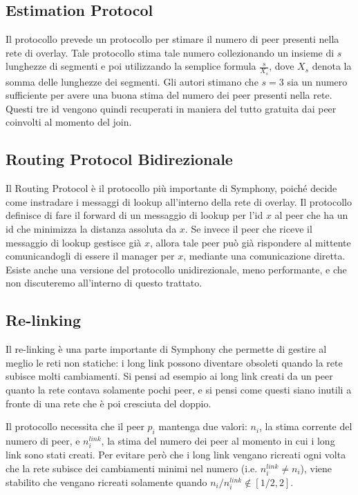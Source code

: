 \documentclass[prodmode,acmtap]{acmlarge}
\begin{document}
\subsection{Estimation Protocol}
Il protocollo prevede un protocollo per stimare il numero di peer presenti nella rete di overlay. Tale protocollo stima tale numero collezionando un insieme di $s$ lunghezze di segmenti e poi utilizzando la semplice formula $\frac{s}{X_s}$, dove $X_s$ denota la somma delle lunghezze dei segmenti. Gli autori stimano che $s = 3$ sia un numero sufficiente per avere una buona stima del numero dei peer presenti nella rete. Questi tre id vengono quindi recuperati in maniera del tutto gratuita dai peer coinvolti al momento del join. 

\subsection{Routing Protocol Bidirezionale}
Il Routing Protocol è il protocollo più importante di Symphony, poiché decide come instradare i messaggi di lookup all'interno della rete di overlay. Il protocollo definisce di fare il forward di un messaggio di lookup per l'id $x$ al peer che ha un id che minimizza la distanza assoluta da $x$. Se invece il peer che riceve il messaggio di lookup gestisce già $x$, allora tale peer può già rispondere al mittente comunicandogli di essere il manager per $x$, mediante una comunicazione diretta. Esiste anche una versione del protocollo unidirezionale, meno performante, e che non discuteremo all'interno di questo trattato.

\subsection{Re-linking}
Il re-linking è una parte importante di Symphony che permette di gestire al meglio le reti non statiche: i long link possono diventare obsoleti quando la rete subisce molti cambiamenti. Si pensi ad esempio ai long link creati da un peer quanto la rete contava solamente pochi peer, e si pensi come questi siano inutili a fronte di una rete che è poi cresciuta del doppio. 

Il protocollo necessita che il peer $p_i$ mantenga due valori: $n_i$, la stima corrente del numero di peer, e $n^{link}_i$, la stima del numero dei peer al momento in cui i long link sono stati creati. Per evitare però che i long link vengano ricreati ogni volta che la rete subisce dei cambiamenti minimi nel numero (i.e. $n^{link}_i \neq n_i$), viene stabilito che vengano ricreati solamente quando $n_i / n^{link}_i \notin [1/2,2]$.
\end{document}

